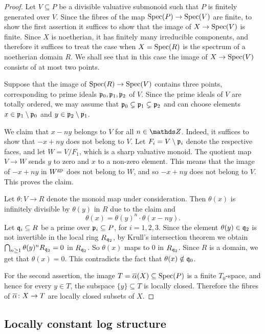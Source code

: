 \begin{proof}
Let $V\subseteq P$ be a divisible valuative submonoid such that $P$ is finitely generated over $V$. Since the fibres of the map $\operatorname{Spec}(P)\to \operatorname{Spec}(V)$ are finite, to show the first assertion it suffices to show that the image of $X\to\operatorname{Spec}(V)$ is finite. 
Since $X$ is noetherian, it has finitely many irreducible components, and therefore it suffices to treat the case when $X=\operatorname{Spec}(R)$ is the spectrum of a noetherian domain $R$. We shall see that in this case the image of $X\to \operatorname{Spec}(V)$ consists of at most two points. 

Suppose that the image of $\operatorname{Spec}(R)\to \operatorname{Spec}(V)$ contains three points, corresponding to prime ideals ${\mathfrak p}_0,{\mathfrak p}_1,{\mathfrak p}_2$ of $V$. Since the prime ideals of $V$ are totally ordered, we may assume that ${\mathfrak p}_0\subsetneq {\mathfrak p}_1\subsetneq {\mathfrak p}_2$ and can choose elements $x\in {\mathfrak p}_1\setminus {\mathfrak p}_0$ and $y\in {\mathfrak p}_2\setminus {\mathfrak p}_1$. 

We claim that $x - ny$ belongs to $V$ for all $n\in\bZ$. Indeed, it suffices to show that $-x + ny$ does not belong to $V$. Let $F_i = V\setminus{\mathfrak p}_i$ denote the respective faces, and let $W = V/F_1$, which is a sharp valuative monoid. The quotient map $V\to W$ sends $y$ to zero and $x$ to a non-zero element. This means that the image of $-x+ny$ in $W^{\rm gp}$ does not belong to $W$, and so $-x+ny$ does not belong to $V$. This proves the claim.

Let $\theta\colon V\to R$ denote the monoid map under consideration. Then $\theta(x)$ is infinitely divisible by $\theta(y)$ in $R$ due to  the claim and
\[
\theta(x) = \theta(y)^n \cdot \theta(x-ny).
\]
Let ${\mathfrak q}_i\subseteq R$  be a prime over ${\mathfrak p}_i\subseteq P$, for $i=1,2,3$. Since the element $\theta(y) \in {\mathfrak q}_2$ is not invertible in the local ring $R_{{\mathfrak q}_2}$, by Krull's intersection theorem we obtain $\bigcap_{n \geq 1} \theta(y)^nR_{{\mathfrak q}_2} = 0$ in $R_{{\mathfrak q}_2}$. 
So $\theta(x)$ maps to $0$ in $R_{{\mathfrak q}_2}$. Since $R$ is a domain, we get that $\theta(x) = 0$. This contradicts the fact that $\theta(x)\notin {\mathfrak q}_0$.

For the second assertion, the image $T = \overline{\alpha}(X)\subseteq \operatorname{Spec}(P)$ is a finite $T_0$-space, and hence for every $y\in T$, the subspace $\{y\}\subseteq T$ is locally closed. Therefore the fibres of $\overline{\alpha}\colon X\to T$ are locally closed subsets of $X$. 
\end{proof}

\subsection{Locally constant log structure}
\label{ss:loc-const}

